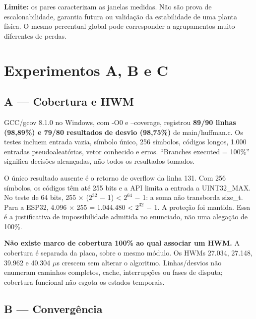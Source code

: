 \textbf{Limite:} os pares caracterizam as janelas medidas. Não são prova de escalonabilidade, garantia futura ou validação da estabilidade de uma planta física. O mesmo percentual global pode corresponder a agrupamentos muito diferentes de perdas.
\par

\clearpage

\section{Experimentos A, B e C}

\subsection{A --- Cobertura e HWM}

GCC/gcov 8.1.0 no Windows, com -O0 e --coverage, registrou \textbf{89/90 linhas (98,89\%) e 79/80 resultados de desvio (98,75\%)} de main/huffman.c. Os testes incluem entrada vazia, símbolo único, 256 símbolos, códigos longos, 1.000 entradas pseudoaleatórias, vetor conhecido e erros. ``Branches executed = 100\%'' significa decisões alcançadas, não todos os resultados tomados.
\par

O único resultado ausente é o retorno de overflow da linha 131. Com 256 símbolos, os códigos têm até 255 bits e a API limita a entrada a UINT32\_MAX. No teste de 64 bits, 255 \ensuremath{\times} (\ensuremath{2^{32}} \ensuremath{-} 1) < \ensuremath{2^{64}} \ensuremath{-} 1: a soma não transborda size\_t. Para a ESP32, 4.096 \ensuremath{\times} 255 = 1.044.480 < \ensuremath{2^{32}} \ensuremath{-} 1. A proteção foi mantida. Essa é a justificativa de impossibilidade admitida no enunciado, não uma alegação de 100\%.
\par

\textbf{Não existe marco de cobertura 100\% ao qual associar um HWM.} A cobertura é separada da placa, sobre o mesmo módulo. Os HWMs 27.034, 27.148, 39.962 e 40.304 \ensuremath{\mu}s crescem sem alterar o algoritmo. Linhas/desvios não enumeram caminhos completos, cache, interrupções ou fases de disputa; cobertura funcional não esgota os estados temporais.
\par

\subsection{B --- Convergência}

